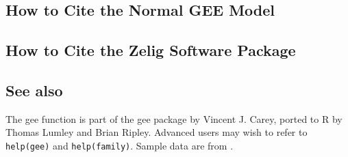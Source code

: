 \subsection*{How to Cite the Normal GEE Model}

\subsection*{How to Cite the Zelig Software Package}
\CiteZelig

\subsection*{See also}
The gee function is part of the gee package by Vincent J. Carey, ported to R by Thomas Lumley and Brian Ripley.  Advanced users may wish to refer to \texttt{help(gee)} and \texttt{help(family)}.  Sample data are from \cite{KinTomWit00}.







